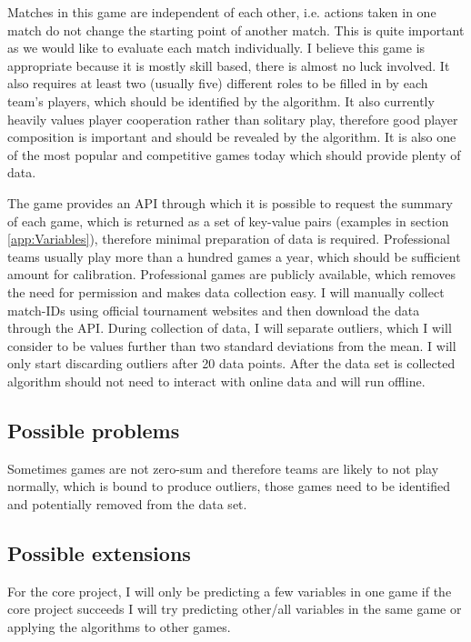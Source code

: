 \documentclass[12pt,a4paper]{article}
\begin{document}
Matches in this game are independent of each other, i.e. actions taken in one match do not change the starting point of another match. This is quite important as we would like to evaluate each match individually. I believe this game is appropriate because it is mostly skill based, there is almost no luck involved. It also requires at least two (usually five) different roles to be filled in by each team's players, which should be identified by the algorithm. It also currently heavily values player cooperation rather than solitary play, therefore good player composition is important and should be revealed by the algorithm. It is also one of the most popular and competitive games today which should provide plenty of  data.

The game provides an API through which it is possible to request the summary of each game, which is returned as a set of key-value pairs (examples in section \ref{app:Variables}), therefore minimal preparation of data is required. Professional teams usually play more than a hundred games a year, which should be sufficient amount for calibration. Professional games are publicly available, which removes the need for permission and makes data collection easy. I will manually collect match-IDs using official tournament websites and then download the data through the API. During collection of data, I will separate outliers, which I will consider to be values further than two standard deviations from the mean. I will only start discarding outliers after 20 data points. After the data set is collected algorithm should not need to interact with online data and will run offline.

\subsection{Possible problems}
Sometimes games are not zero-sum and therefore teams are likely to not play normally, which is bound to produce outliers, those games need to be identified and potentially removed from the data set.

\subsection{Possible extensions}
For the core project, I will only be predicting a few variables in one game if the core project succeeds I will try predicting other/all variables in the same game or applying the algorithms to other games.
\end{document}
